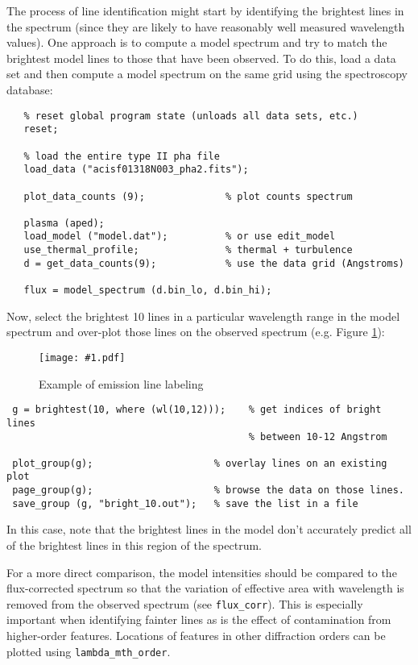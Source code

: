 \documentclass{book}
\newcommand{\putfig}[1]{\texttt{[image: \#1.pdf]}}
\newcommand{\putfig}[1]{\psfig{file=#1.ps}}
\begin{document}
The process of line identification might start by identifying the brightest
lines in the spectrum (since they are likely to have reasonably well
measured wavelength values).  One approach is to compute a model
spectrum and try to match the brightest model lines to those that have
been observed.  To do this, load a data set and then compute a model
spectrum on the same grid using the spectroscopy database:

 \begin{verbatim}
   % reset global program state (unloads all data sets, etc.)
   reset;

   % load the entire type II pha file
   load_data ("acisf01318N003_pha2.fits");

   plot_data_counts (9);              % plot counts spectrum

   plasma (aped);
   load_model ("model.dat");          % or use edit_model
   use_thermal_profile;               % thermal + turbulence
   d = get_data_counts(9);            % use the data grid (Angstroms)

   flux = model_spectrum (d.bin_lo, d.bin_hi);
 \end{verbatim}

Now, select the brightest 10
lines in a particular wavelength range in the model spectrum and
over-plot those lines on the observed spectrum (e.g. Figure
\ref{fig:line_id}):

\begin{figure}[ht]
\putfig{figures/line_id}
\caption{Example of emission line labeling}
\label{fig:line_id}
\end{figure}

\begin{verbatim}
 g = brightest(10, where (wl(10,12)));    % get indices of bright lines
                                          % between 10-12 Angstrom

 plot_group(g);                     % overlay lines on an existing plot
 page_group(g);                     % browse the data on those lines.
 save_group (g, "bright_10.out");   % save the list in a file
\end{verbatim}
In this case, note that the brightest lines in the model don't accurately
predict all of the brightest lines in this region of the spectrum.

For a more direct comparison, the model intensities should be compared to
the flux-corrected spectrum so that the variation of effective area with
wavelength is removed from the observed spectrum (see {\tt flux\_corr}).
This is especially important when identifying fainter lines as is the effect
of contamination from higher-order features. Locations of features in other
diffraction orders can be plotted using {\tt lambda\_mth\_order}.
\end{document}
